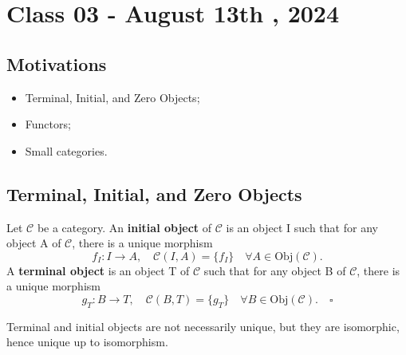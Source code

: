\documentclass[../category_theory.tex]{subfiles}
\begin{document}
\section{Class 03 - August 13th , 2024}
\subsection{Motivations}
\begin{itemize}
	\item Terminal, Initial, and Zero Objects;
	\item Functors;
	\item Small categories.
\end{itemize}
\subsection{Terminal, Initial, and Zero Objects}
\begin{def*}
	Let \(\mathcal{C}\) be a category. An \textbf{initial object} of \(\mathcal{C}\) is an object I such that for any object A of \(\mathcal{C}\), there is a unique morphism
	\[
		f_{I}:I\rightarrow A,\quad \mathcal{C}(I, A)=\{f_{I}\}\quad \forall A\in \mathrm{Obj}(\mathcal{C}).
	\]
	A \textbf{terminal object} is an object T of \(\mathcal{C}\) such that for any object B of \(\mathcal{C}\), there is a unique morphism
	\[
		g_{T}:B\rightarrow T,\quad \mathcal{C}(B, T)=\{g_{T}\}\quad \forall B\in \mathrm{Obj}(\mathcal{C}).\quad \square
	\]
\end{def*}
Terminal and initial objects are not necessarily unique, but they are isomorphic, hence unique up to isomorphism.
\end{document}
